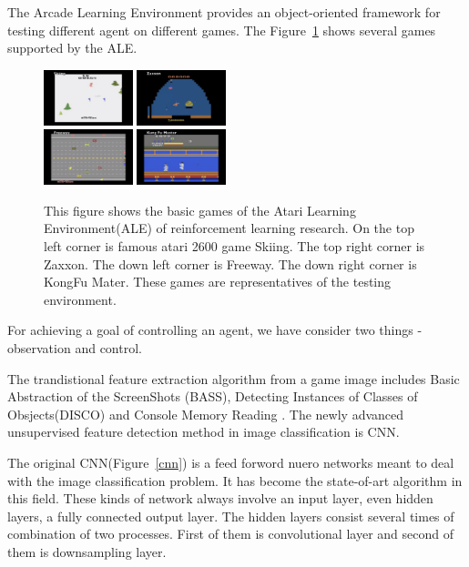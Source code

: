 \documentclass{article}
\begin{document}
The Arcade Learning Environment provides an object-oriented framework for testing different agent on different games. The Figure~\ref{atari_game} shows several games supported by the ALE.
\begin{figure}[h!]
\centering
{\includegraphics[width = 0.23\textwidth]{1}} 
{\includegraphics[width = 0.23\textwidth]{2}}\\
{\includegraphics[width = 0.23\textwidth]{3}}
{\includegraphics[width = 0.23\textwidth]{4}} 
\caption{This figure shows the basic games of the Atari Learning Environment(ALE) of reinforcement learning research. On the top left corner is famous atari 2600 game Skiing. The top right corner is Zaxxon. The down left corner is Freeway. The down right corner is KongFu Mater. These games are representatives of the testing environment.}\label{atari_game}
\end{figure}

For achieving a goal of controlling an agent, we have consider two things - observation and control. 

The trandistional feature extraction algorithm from a game image includes Basic Abstraction of the ScreenShots (BASS), 	Detecting Instances of Classes of Obsjects(DISCO) and Console Memory Reading \citep{naddaf2010game}. The newly advanced unsupervised feature detection method in image classification is CNN.

The original CNN(Figure~\ref{cnn}) is a feed forword nuero networks meant to deal with the image classification problem. It has become the state-of-art algorithm in this field. These kinds of network always involve an input layer, even hidden layers, a fully connected output layer. The hidden layers consist several times of combination of two processes. First of them is convolutional layer and second of them is downsampling layer.
\end{document}
